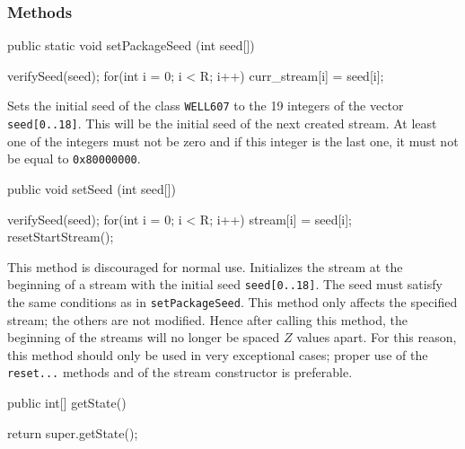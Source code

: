 \subsubsection* {Methods}
\begin{code}
   public static void setPackageSeed (int seed[]) \begin{hide} {
      verifySeed(seed);
      for(int i = 0; i < R; i++)
         curr_stream[i] = seed[i];
   } \end{hide}
\end{code}
\begin{tabb} Sets the initial seed of the class \texttt{WELL607} to the 19
  integers of the vector \texttt{seed[0..18]}.
  This will be the initial seed of the next created stream.
  At least one of the integers must not be zero and if this integer is
  the last one, it must not be equal to \texttt{0x80000000}.
\end{tabb}
\begin{htmlonly}
\end{htmlonly}
\begin{code}

   public void setSeed (int seed[]) \begin{hide} {
      verifySeed(seed);
      for(int i = 0; i < R; i++)
         stream[i] = seed[i];
      resetStartStream();
   }\end{hide}
\end{code}
\begin{tabb} This method is discouraged for normal use.
  Initializes the stream at the beginning of a stream with the initial
  seed \texttt{seed[0..18]}. The seed must satisfy the same
  conditions as in \texttt{setPackageSeed}.
  This method only affects the specified stream; the others are not
  modified.  Hence after calling this method, the beginning of the streams
  will no longer be spaced $Z$ values apart.
  For this reason, this method should only be used in very exceptional cases;
  proper use of the \texttt{reset...} methods and of the stream constructor is
  preferable.
\end{tabb}
\begin{htmlonly}
\end{htmlonly}
\begin{code}

   public int[] getState() \begin{hide} {
      return super.getState();
   }\end{hide}
\end{code}
